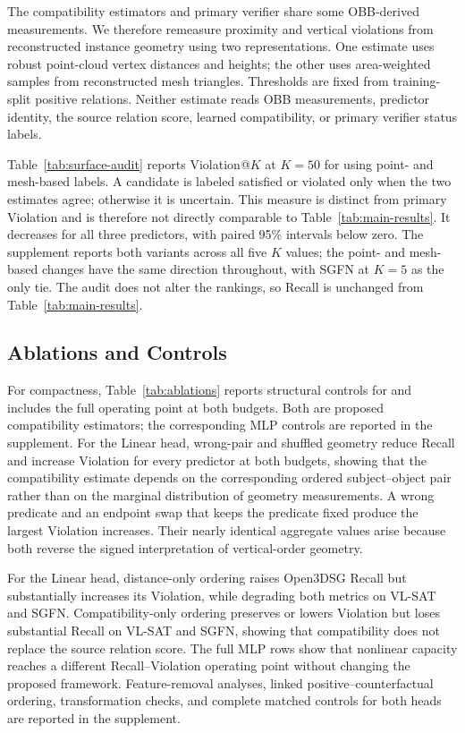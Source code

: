 The compatibility estimators and primary verifier share some OBB-derived
measurements. We therefore remeasure proximity and vertical violations from
reconstructed instance geometry using two representations. One estimate uses
robust point-cloud vertex distances and heights; the other uses area-weighted
samples from reconstructed mesh triangles. Thresholds are fixed from
training-split positive relations. Neither estimate reads OBB measurements,
predictor identity, the source relation score, learned compatibility, or primary
verifier status labels.

Table~\ref{tab:surface-audit} reports Violation@$K$ at $K=50$ for
\methodlinear{} using point- and mesh-based labels. A candidate is labeled
satisfied or violated only when the two estimates agree; otherwise it is
uncertain. This measure is distinct from primary Violation and is therefore not
directly comparable to Table~\ref{tab:main-results}. It decreases for all three
predictors, with paired 95\% intervals below zero. The supplement reports both
\method{} variants across all five $K$ values; the point- and mesh-based changes
have the same direction throughout, with SGFN at $K=5$ as the only tie. The
audit does not alter the rankings, so Recall is unchanged from
Table~\ref{tab:main-results}.

\subsection{Ablations and Controls}

For compactness, Table~\ref{tab:ablations} reports structural controls for
\methodlinear{} and includes the full \methodmlp{} operating point at both
budgets. Both are proposed compatibility estimators; the corresponding MLP
controls are reported in the supplement. For the Linear head, wrong-pair and
shuffled geometry reduce Recall and increase Violation for every predictor at
both budgets, showing that the compatibility estimate depends on the
corresponding ordered subject--object pair rather than on the marginal
distribution of geometry measurements. A wrong predicate and an endpoint swap
that keeps the predicate fixed produce the largest Violation increases. Their
nearly identical aggregate values arise because both reverse the signed
interpretation of vertical-order geometry.

For the Linear head, distance-only ordering raises Open3DSG Recall but
substantially increases its Violation, while degrading both metrics on VL-SAT
and SGFN. Compatibility-only ordering preserves or lowers Violation but loses
substantial Recall on VL-SAT and SGFN, showing that compatibility does not
replace the source relation score. The full MLP rows show that nonlinear
capacity reaches a different Recall--Violation operating point without changing
the proposed framework. Feature-removal analyses, linked
positive--counterfactual ordering, transformation checks, and complete matched
controls for both heads are reported in the supplement.
